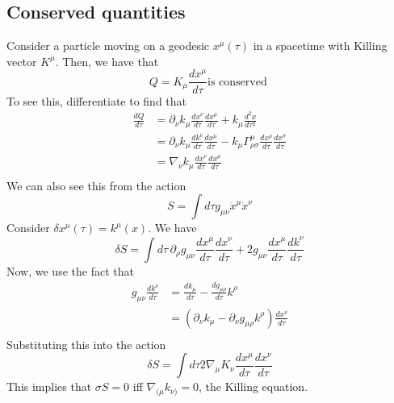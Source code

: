\subsection{Conserved quantities} 
Consider a particle moving on a geodesic  $ x ^ \mu ( \tau ) $ 
in a spacetime with Killing vector $ K ^ \mu $. 
Then, we have that 
\[
 Q  = K_ \mu \frac{d x ^ \mu }{ d \tau } \text{is conserved }
\] To see this, differentiate to find that 
\begin{align*}
	\frac{d Q }{ d \tau }   & = \partial  _ \nu k _ \mu \frac{d x ^ \nu }{ d \tau } \frac{ d x ^ \mu }{ d \tau } 
	+ k _ \mu \frac{ d ^ 2 x  }{ d \tau ^ 2 } \\
	&=  \partial  _ \nu k _ \mu \frac{d k ^ \nu }{ d \tau } \frac{ d x ^ \mu }{ d \tau }  - 
	k _ \mu \Gamma ^ \mu _{ \rho \sigma } \frac{d x ^ \rho }{ d \tau } \frac{ d x ^ \sigma }{ d \tau } \\
	&=  \nabla _ \nu k _ \mu \frac{ d x ^ \nu }{ d \tau } \frac{ d x ^ \mu }{ d \tau } \\ 
\end{align*} 
We can also see this from the action 
\[
 S  = \int d \tau g_{ \mu \nu } \dot{ x } ^ \mu \dot{ x } ^ \nu   
\] Consider $ \delta x ^ \mu ( \tau )  = k ^ \mu ( x) $. We have 
 \[
 \delta S  = \int d \tau \, \partial  _ \rho g_{ \mu \nu } \frac{ d x^ \mu }{ d \tau } \frac{ d x ^ \nu }{ d \tau } 
 + 2 g_{ \mu \nu } \frac{d x ^ \mu }{ d \tau } \frac{ dk  ^ \nu }{ d \tau }
\] 
Now, we use the fact that 
\begin{align*}
	g_{ \mu \nu } \frac{d  k ^ \nu }{ d \tau } &=  \frac{d k _\mu }{ d \tau } - \frac{d g _{ \mu \rho } }{ d \tau } k ^ \rho  \\
						   &=  \left(  \partial  _ \nu k _ \mu 
						    - \partial  _ \nu g _{ \mu \rho } k ^ \rho \right)  
						    \frac{ d x ^ \nu }{ d \tau }\\
\end{align*}
Substituting this into the action 
\[
 \delta S = \int d \tau 2 \nabla _ \mu K _ \nu \frac{ d x ^ \mu }{ d \tau } \frac{ d x ^ \nu }{ d \tau }
\] This implies that $ \sigma S = 0 $ iff $ \nabla _{ ( \mu } k_{ \nu ) }  = 0 $, the Killing equation.

